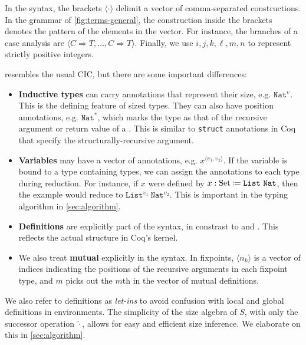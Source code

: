 \documentclass[nonacm,screen,10pt]{acmart}
\begin{document}
In the syntax, the brackets $\langle \cdot \rangle$ delimit a vector of comma-separated constructions. In the grammar of \autoref{fig:terms-general}, the construction inside the brackets denotes the pattern of the elements in the vector. For instance, the branches of a case analysis are $\langle C \Rightarrow T, \dots, C \Rightarrow T \rangle$. Finally, we use $i, j, k, \ell, m, n$ to represent strictly positive integers.

\lang resembles the usual CIC, but there are some important differences:

\begin{itemize}
    \item \textbf{Inductive types} can carry annotations that represent their size, e.g. $\texttt{Nat}^\upsilon$. This is the defining feature of sized types. They can also have position annotations, e.g. $\texttt{Nat}^*$, which marks the type as that of the recursive argument or return value of a \cofixpoint. This is similar to \texttt{struct} annotations in Coq that specify the structurally-recursive argument.
    \item \textbf{Variables} may have a vector of annotations, e.g. $x^{\langle \upsilon_1, \upsilon_2 \rangle}$. If the variable is bound to a type containing \coinductive types, we can assign the annotations to each \coinductive type during reduction. For instance, if $x$ were defined by $x : \text{Set} \coloneqq \texttt{List}\ \texttt{Nat}$, then the example would reduce to $\texttt{List}^{\upsilon_1}\ \texttt{Nat}^{\upsilon_2}$. This is important in the typing algorithm in \autoref{sec:algorithm}.
    \item \textbf{Definitions} are explicitly part of the syntax, in constrast to \CIChat and \CIChatbar \cite{cic-hat-bar}. This reflects the actual structure in Coq's kernel.
    \item We also treat \textbf{mutual \cofixpoints} explicitly in the syntax. In fixpoints, $\langle n_k \rangle$ is a vector of indices indicating the positions of the recursive arguments in each fixpoint type, and $m$ picks out the $m$th \cofixpoint in the vector of mutual definitions.
\end{itemize}

We also refer to definitions as \textit{let-ins} to avoid confusion with local and global definitions in environments. The simplicity of the size algebra of $S$, with only the successor operation $\widehat{\cdot}$, allows for easy and efficient size inference. We elaborate on this in \autoref{sec:algorithm}.
\end{document}
